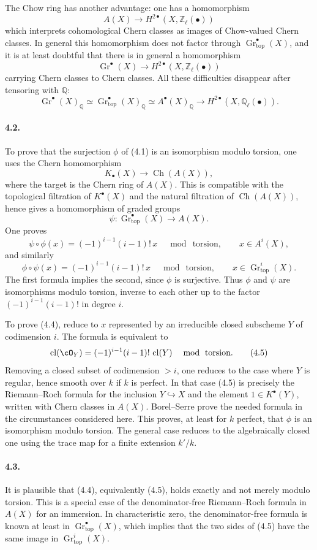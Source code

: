 \documentclass[11pt]{article}
\theoremstyle{plain}
\theoremstyle{definition}
\theoremstyle{remark}
\newcommand{\QQ}{\mathbb Q}
\newcommand{\ZZ}{\mathbb Z}
\DeclareMathOperator{\Gr}{Gr}
\DeclareMathOperator{\cl}{cl}
\newcommand{\longto}{\longrightarrow}
\providecommand{\Ch}{\operatorname{Ch}}
\providecommand{\topf}{\mathrm{top}}
\begin{document}
The Chow ring has another advantage: one has a homomorphism
\[
A(X)\to H^{2\bullet}(X,\ZZ_\ell(\bullet))
\]
which interprets cohomological Chern classes as images of Chow-valued Chern classes. In general this homomorphism does not factor through $\Gr^\bullet_{\topf}(X)$, and it is at least doubtful that there is in general a homomorphism
\[
\Gr^\bullet(X)\to H^{2\bullet}(X,\ZZ_\ell(\bullet))
\]
carrying Chern classes to Chern classes. All these difficulties disappear after tensoring with $\QQ$:
\[
\Gr^\bullet(X)_\QQ\simeq
\Gr^\bullet_{\topf}(X)_\QQ\simeq
A^\bullet(X)_\QQ
\longto H^{2\bullet}(X,\QQ_\ell(\bullet)).
\tag{4.2}
\]

\paragraph{4.2.}
To prove that the surjection $\phi$ of (4.1) is an isomorphism modulo torsion, one uses the Chern homomorphism
\[
K_\bullet(X)\longto \Ch(A(X)),
\]
where the target is the Chern ring of $A(X)$. This is compatible with the topological filtration of $K^\bullet(X)$ and the natural filtration of $\Ch(A(X))$, hence gives a homomorphism of graded groups
\[
\psi:\Gr^\bullet_{\topf}(X)\longto A(X).
\tag{4.3}
\]
One proves
\[
\psi\circ\phi(x)=(-1)^{i-1}(i-1)!\,x
\quad \bmod\ \text{torsion},
\qquad x\in A^i(X),
\tag{4.4}
\]
and similarly
\[
\phi\circ\psi(x)=(-1)^{i-1}(i-1)!\,x
\quad \bmod\ \text{torsion},
\qquad x\in \Gr^i_{\topf}(X).
\]
The first formula implies the second, since $\phi$ is surjective. Thus $\phi$ and $\psi$ are isomorphisms modulo torsion, inverse to each other up to the factor $(-1)^{i-1}(i-1)!$ in degree $i$.

To prove (4.4), reduce to $x$ represented by an irreducible closed subscheme $Y$ of codimension $i$. The formula is equivalent to
\[
\cl(\cO_Y)=(-1)^{i-1}(i-1)!\,\cl(Y)
\quad\bmod\ \text{torsion}.
\tag{4.5}
\]
Removing a closed subset of codimension $>i$, one reduces to the case where $Y$ is regular, hence smooth over $k$ if $k$ is perfect. In that case (4.5) is precisely the Riemann--Roch formula for the inclusion $Y\hookrightarrow X$ and the element $1\in K^\bullet(Y)$, written with Chern classes in $A(X)$. Borel--Serre prove the needed formula in the circumstances considered here. This proves, at least for $k$ perfect, that $\phi$ is an isomorphism modulo torsion. The general case reduces to the algebraically closed one using the trace map for a finite extension $k'/k$.

\paragraph{4.3.}
It is plausible that (4.4), equivalently (4.5), holds exactly and not merely modulo torsion. This is a special case of the denominator-free Riemann--Roch formula in $A(X)$ for an immersion. In characteristic zero, the denominator-free formula is known at least in $\Gr^\bullet_{\topf}(X)$, which implies that the two sides of (4.5) have the same image in $\Gr^i_{\topf}(X)$.
\end{document}
